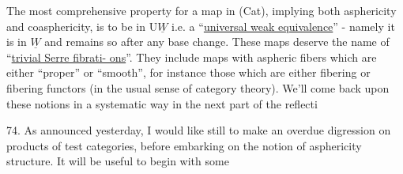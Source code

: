 The most comprehensive property  for a map in (Cat),
implying both asphericity and coasphericity, is to be in U$\underline{W}$ i.e. a
``\uline{universal weak equivalence}'' - namely it is in $\underline{W}$ and remains so after
any base change. These maps deserve the name of ``\uline{trivial Serre fibrati-%
ons}''. They include maps with aspheric fibers which are either ``proper''
or ``smooth'', for instance those which are either fibering or fibering
functors (in the usual sense of category theory). We'll come back upon
these notions in a  systematic way in the next part of the reflecti

74. As announced yesterday, I would like still to make an overdue
digression on products of test categories, before embarking on the
notion of asphericity structure. It will be useful to begin with some

